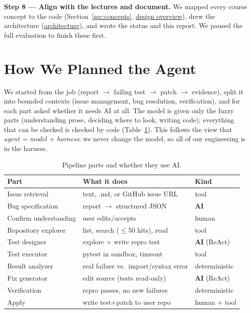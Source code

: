 \documentclass[manuscript,screen,nonacm]{acmart}
\newcommand{\repo}{https://github.com/keshavdubeyy/reproagent_autose}
\newcommand{\rlink}[2]{\href{\repo/blob/main/#1}{#2}}
\begin{document}
\textbf{Step 8 --- Align with the lectures and document.} We mapped every course concept to the code (Section~\ref{sec:concepts},
\rlink{docs/design-overview.md}{design overview}), drew the architecture (\rlink{docs/architecture.md}{architecture}),
and wrote the status and this report. We paused the full evaluation to finish these first.

\section{How We Planned the Agent}\label{sec:plan}
We started from the job (report $\rightarrow$ failing test $\rightarrow$ patch $\rightarrow$ evidence), split it into bounded contexts
(issue management, bug resolution, verification), and for each part asked whether it needs AI at all.
The model is given only the fuzzy parts (understanding prose, deciding where to look, writing code);
everything that can be checked is checked by code (Table~\ref{tab:ai}). This follows the view that \emph{agent = model + harness}:
we never change the model, so all of our engineering is in the harness.

\begin{table}[t]
\caption{Pipeline parts and whether they use AI.}
\label{tab:ai}
\small
\begin{tabular}{@{}lll@{}}
\toprule
Part & What it does & Kind \\
\midrule
Issue retrieval & text, .md, or GitHub issue URL & tool \\
Bug specification & report $\rightarrow$ structured JSON & \textbf{AI} \\
Confirm understanding & user edits/accepts & human \\
Repository explorer & list, search ($\le$50 hits), read & tool \\
Test designer & explore + write repro test & \textbf{AI} (ReAct) \\
Test executor & pytest in sandbox, timeout & tool \\
Result analyzer & real failure vs.\ import/syntax error & deterministic \\
Fix generator & edit source (tests read-only) & \textbf{AI} (ReAct) \\
Verification & repro passes, no new failures & deterministic \\
Apply & write test+patch to user repo & human + tool \\
\bottomrule
\end{tabular}
\end{table}
\end{document}
